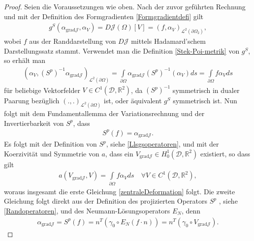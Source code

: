 \begin{proof}
Seien die Voraussetzungen wie oben. Nach der zuvor geführten Rechnung und mit der Definition des Formgradienten \ref{Formgradientdefi} gilt
\begin{align*}
	g^S(\alpha_{\text{grad}\mathcal{J}}, \alpha_V) = D\mathcal{J}(\Omega)[V] = (f,\alpha_V)_{\mathcal{L}^2(\partial\Omega_2)},
\end{align*}
wobei $f$ aus der Randdarstellung von $D\mathcal{J}$ mittels Hadamard'schem Darstellungssatz stammt. Verwendet man die Definition \ref{Stek-Poi-metrik} von $g^S$, so erhält man
\begin{align*}
	(\alpha_V,(S^p)^{-1} \alpha_{\text{grad}\mathcal{J}})_{\mathcal{L}^2(\partial\Omega)} = \underset{\partial\Omega}{\int} \alpha_{\text{grad}\mathcal{J}} (S^p)^{-1}(\alpha_V)ds = \underset{\partial\Omega}{\int} f \alpha_V ds
\end{align*}
für beliebige Vektorfelder $V\in C^1(\mathcal{D}, \mathbb{R}^2)$, da $(S^p)^{-1}$  symmetrisch in dualer Paarung bezüglich $(.,.)_{\mathcal{L}^2(\partial\Omega)}$ ist, oder äquivalent $g^S$ symmetrisch ist.  Nun folgt mit dem Fundamentallemma der Variationsrechnung und der Invertierbarkeit von $S^p$, dass
\begin{align*}
	S^p(f) = \alpha_{\text{grad}\mathcal{J}}.
\end{align*}
Es folgt mit der Definition von $S^p$, siehe \ref{Llsgsoperatoren}, und mit der Koerzivität und Symmetrie von $a$, dass ein $V_{\text{grad}\mathcal{J}} \in H^1_0(\mathcal{D},\mathbb{R}^2)$ existiert, so dass gilt
\begin{align*}
	a(V_{\text{grad}\mathcal{J}},V) = \underset{\partial\Omega}{\int} f \alpha_V ds \quad \forall V\in C^1(\mathcal{D},\mathbb{R}^2),
\end{align*}
woraus insgesamt die erste Gleichung \ref{zentraleDeformation} folgt. Die zweite Gleichung folgt direkt aus der Definition des projizierten Operators $S^p$ , siehe \ref{Randoperatoren}, und des Neumann-Lösungsoperators $E_N$, denn
\begin{align*}
	\alpha_{\text{grad}\mathcal{J}} = S^p(f) = n^T(\gamma_0\circ E_N(f\cdot n)) = n^T(\gamma_0 \circ V_{\text{grad}\mathcal{J}}).
\end{align*}
\end{proof}

